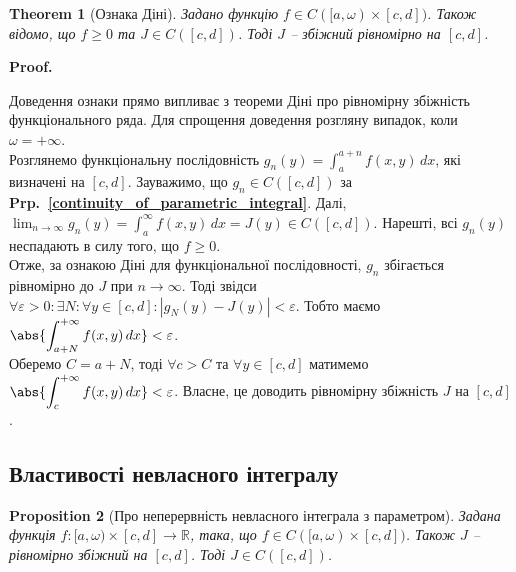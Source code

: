 \documentclass[a4paper, 10pt]{article}
\makeatletter
\theoremstyle{theoremdd}
\newtheorem{theorem}{Theorem}[subsection]
\theoremstyle{theoremdd}
\theoremstyle{theoremdd}
\theoremstyle{theoremdd}
\theoremstyle{theoremdd}
\theoremstyle{theoremdd}
\newtheorem{proposition}[theorem]{Proposition}
\theoremstyle{theoremdd}
\theoremstyle{theoremdd}
\theoremstyle{theoremdd}
\newcommand\prpref[1]{\textbf{Prp.~\ref{#1}}}
\renewenvironment{proof}[1][Proof.\\]{\par
\pushQED{\hfill \qed}%
\normalfont \topsep6\p@\@plus6\p@\relax
\trivlist
\item\relax
{\bfseries
#1\@addpunct{.}}\hspace\labelsep\ignorespaces
}{%
\popQED\endtrivlist\@endpefalse
}
\makeatother
\begin{document}
\begin{theorem}[Ознака Діні]
Задано функцію $f \in C([a,\omega) \times [c,d])$. Також відомо, що $f \geq 0$ та $J\in C([c,d])$. Тоді $J$ -- збіжний рівномірно на $[c,d]$.
\end{theorem}

\begin{proof}
Доведення ознаки прямо випливає з теореми Діні про рівномірну збіжність функціонального ряда. Для спрощення доведення розгляну випадок, коли $\omega = +\infty$.\\
Розглянемо функціональну послідовність $g_n(y) = \displaystyle\int_a^{a+n} f(x,y)\,dx$, які визначені на $[c,d]$. Зауважимо, що $g_n \in C([c,d])$ за \prpref{continuity_of_parametric_integral}. Далі, $\displaystyle\lim_{n \to \infty} g_n(y) = \int_a^\infty f(x,y)\,dx = J(y) \in C([c,d])$. Нарешті, всі $g_n(y)$ неспадають в силу того, що $f \geq 0$.\\
Отже, за ознакою Діні для функціональної послідовності, $g_n$ збігається рівномірно до $J$ при $n \to \infty$. Тоді звідси $\forall \varepsilon > 0: \exists N: \forall y \in [c,d]: |g_N(y) - J(y)| < \varepsilon$. Тобто маємо $\displaystyle\abs{\int_{a+N}^{+\infty} f(x,y)\,dx} < \varepsilon$.\\
Оберемо $C = a+N$, тоді $\forall c > C$ та $\forall y \in [c,d]$ матимемо $\displaystyle\abs{\int_c^{+\infty} f(x,y)\,dx} < \varepsilon$. Власне, це доводить рівномірну збіжність $J$ на $[c,d]$.
\end{proof}

\subsection{Властивості невласного інтегралу}
\begin{proposition}[Про неперервність невласного інтеграла з параметром]
Задана функція $f \colon [a,\omega) \times [c,d] \to \mathbb{R}$, така, що $f \in C([a,\omega) \times [c,d])$. Також $J$ -- рівномірно збіжний на $[c,d]$. Тоді $J \in C([c,d])$.
\end{proposition}
\end{document}
